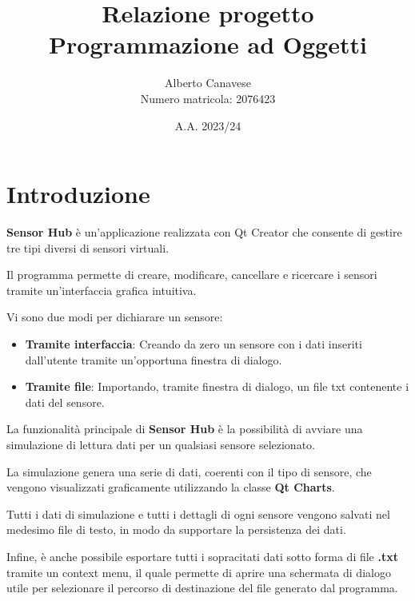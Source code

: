 \documentclass{article}
\title{Relazione progetto Programmazione ad Oggetti}
\author{Alberto Canavese\\Numero matricola: 2076423}
\date{A.A. 2023/24}
\begin{document}
    \pretitle{\begin{center}\LARGE}
    \posttitle{\end{center}}
    \preauthor{\begin{center}\large \lineskip 0.5em}
    \postauthor{\end{center}}
    \predate{\begin{center}\large}
    \postdate{\end{center}}
    \maketitle

    \renewcommand{\familydefault}{\sfdefault}

    \newpage
    \section{Introduzione}
    \textbf{Sensor Hub} è un'applicazione realizzata con Qt Creator che consente di gestire tre tipi
    diversi di sensori virtuali.
    
    Il programma permette di creare, modificare, cancellare e ricercare i sensori tramite un'interfaccia
    grafica intuitiva.
        
    Vi sono due modi per dichiarare un sensore:
    \begin{itemize}
        \item \textbf{Tramite interfaccia}: Creando da zero un sensore con i dati inseriti dall'utente tramite un'opportuna finestra di dialogo.
        \item \textbf{Tramite file}: Importando, tramite finestra di dialogo, un file txt contenente i dati del sensore.
    \end{itemize} 
    La funzionalità principale di \textbf{Sensor Hub} è la possibilità di avviare una simulazione di lettura dati per un qualsiasi sensore selezionato. 
    
    La simulazione genera una serie di dati, coerenti con il tipo di sensore, che vengono visualizzati graficamente utilizzando la classe \textbf{Qt Charts}.

    Tutti i dati di simulazione e tutti i dettagli di ogni sensore vengono salvati nel medesimo file di testo, in modo da supportare la persistenza dei dati. 

    Infine, è anche possibile esportare tutti i sopracitati dati sotto forma di file \textbf{.txt} tramite un context menu, il quale permette di aprire una schermata
    di dialogo utile per selezionare il percorso di destinazione del file generato dal programma.  
\end{document}
